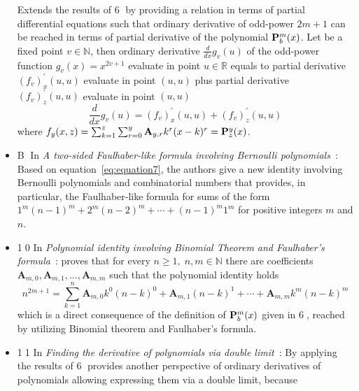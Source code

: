 \begin{itemize}
    Extends the results of {\Large \textcircled{\normalsize 6}} by providing a relation in terms of partial differential equations such that
    ordinary derivative of odd-power $2m+1$ can be reached in terms of partial derivative of the polynomial ${\mathbf{P}}\sp{m} \sb{b}(x)$.
    Let be a fixed point $v\in \mathbb{N}$, then ordinary derivative $\frac{d}{dx} g_v (u)$ of the odd-power function $g_v(x) = x^{2v + 1}$
    evaluate in point $u\in\mathbb{R}$ equals to partial derivative $(f_{v})^{'}_{x} (u, u)$ evaluate in point $(u, u)$ plus
    partial derivative $(f_{v})^{'}_{z} (u, u)$ evaluate in point $(u, u)$
    \begin{equation}
        \frac{d}{dx} g_v (u) = (f_{v})^{'}_{x} (u, u) + (f_{v})^{'}_{z} (u, u)
        \label{eq:odd-exponential-identity}
    \end{equation}
    where $f_{y} (x, z) = \sum_{k=1}^{z} \sum_{r=0}^{y} {\mathbf{A}} \sb{y,r} k^r (x-k)^r = {\mathbf{P}}\sp{y} \sb{z}(x)$.
    \item {\Large \textcircled{\normalsize B}}
    In \textit{A two-sided Faulhaber-like formula involving Bernoulli polynomials}~\cite{barbero2020two}:
    Based on equation~\eqref{eq:equation7}, the authors give a new identity involving
    Bernoulli polynomials and combinatorial numbers that provides,
    in particular, the Faulhaber-like formula for sums of the form $1^m(n-1)^m + 2^m (n -2)^m + \cdots + (n - 1)^m 1^m$
    for positive integers $m$ and $n$.
    \item {\Large \textcircled{\normalsize 10}}
    In \textit{Polynomial identity involving Binomial Theorem and Faulhaber's formula}~\cite{kolosov2023polynomial}:
    proves that
    for every $n\geq 1, \; n,m\in\mathbb{N}$
    there are coefficients $\mathbf{A}_{m,0}, \mathbf{A}_{m,1}, \ldots, \mathbf{A}_{m,m}$ such that
    the polynomial identity holds
    \[
        n^{2m+1} = \sum_{k=1}^{n} \mathbf{A}_{m,0} k^0 (n-k)^0 + \mathbf{A}_{m,1}(n-k)^1
        + \cdots + \mathbf{A}_{m,m} k^m (n-k)^m
    \]
    which is a direct consequence of the definition of ${\mathbf{P}}\sp{m} \sb{b}(x)$ given in {\Large \textcircled{\normalsize 6}},
    reached by utilizing Binomial theorem and Faulhaber's formula.
    \item {\Large \textcircled{\normalsize 11}}
    In \textit{Finding the derivative of polynomials via double limit}~\cite{kolosov_2024_10575485}:
    By applying the results of {\Large \textcircled{\normalsize 6}} provides
    another perspective of ordinary derivatives of polynomials allowing expressing
    them via a double limit, because

\end{itemize}

